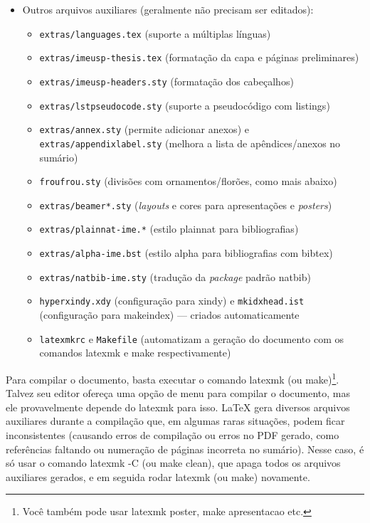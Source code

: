 \begin{itemize}
  \item Outros arquivos auxiliares (geralmente não precisam ser editados):
  \begin{itemize}
    \item \texttt{extras/languages.tex} (suporte a múltiplas línguas)
    \item \texttt{extras/imeusp-thesis.tex} (formatação da capa e páginas preliminares)
    \item \texttt{extras/imeusp-headers.sty} (formatação dos cabeçalhos)
    \item \texttt{extras/lstpseudocode.sty} (suporte a pseudocódigo com \textsf{listings})
    \item \texttt{extras/annex.sty} (permite adicionar anexos) e
          \texttt{extras/appendixlabel.sty} (melhora a lista de
          apêndices/anexos no sumário)
    \item \texttt{froufrou.sty} (divisões com ornamentos/florões, como mais abaixo)
    \item \texttt{extras/beamer*.sty} (\textit{layouts} e cores para
          apresentações e \textit{posters})
    \item \texttt{extras/plainnat-ime.*} (estilo plainnat para bibliografias)
    \item \texttt{extras/alpha-ime.bst} (estilo alpha para bibliografias com
          bibtex)
    \item \texttt{extras/natbib-ime.sty} (tradução da \textit{package}
          padrão natbib)
    \item \texttt{hyperxindy.xdy} (configuração para xindy) e
          \texttt{mkidxhead.ist} (configuração para makeindex) --- criados automaticamente
    \item \texttt{latexmkrc} e \texttt{Makefile} (automatizam a geração do
          documento com os comandos \textsf{latexmk} e \textsf{make} respectivamente)
  \end{itemize}
\end{itemize}

\froufrou

Para compilar o documento, basta executar o comando \textsf{latexmk} (ou
\textsf{make})\footnote{Você também pode usar \textsf{latexmk poster},
\textsf{make apresentacao} etc.}. Talvez seu editor ofereça uma
opção de menu para compilar o documento, mas ele provavelmente depende do
\textsf{latexmk} para isso. \LaTeX{} gera diversos arquivos auxiliares
durante a compilação que, em algumas raras situações, podem ficar
inconsistentes (causando erros de compilação ou erros no PDF gerado, como
referências faltando ou numeração de páginas incorreta no sumário). Nesse
caso, é só usar o comando \textsf{latexmk -C} (ou \textsf{make clean}),
que apaga todos os arquivos auxiliares gerados, e em seguida rodar
\textsf{latexmk} (ou \textsf{make}) novamente.

